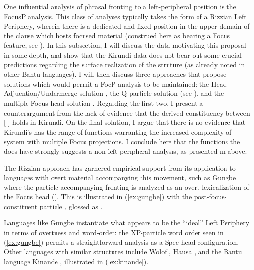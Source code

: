 \documentclass[12pt]{article}
\begin{document}
One influential analysis of phrasal fronting to a left-peripheral position is the FocusP analysis. This class of analyses typically takes the form of a Rizzian Left Periphery, wherein there is a dedicated and fixed position in the upper domain of the clause which hosts focused material (construed here as bearing a Focus feature, see \citealt{rizzi-1997}). In this subsection, I will discuss the data motivating this proposal in some depth, and show that the Kirundi data does not bear out some crucial predictions regarding the surface realization of the struture (as already noted in other Bantu languages). I will then discuss three approaches that propose solutions which would permit a FocP-analysis to be maintained: the Head Adjucntion/Undermerge solution \citep{fschwarz-2003,yuan-2017,yuan-2017gen}, the Q-particle solution (see \citealt{cable-2007,branan-erlewine-2022}), and the multiple-Focus-head solution \citep{abels-muriungi-2008}. Regarding the first two, I present a counterargument from the lack of evidence that the derived constituency between [ ] holds in Kirundi. On the final solution, I argue that there is no evidence that Kirundi's  has the range of functions warranting the increased complexity of system with multiple Focus projections. I conclude here that the functions the  does have strongly suggests a non-left-peripheral analysis, as presented in above.

The Rizzian  approach has garnered empirical support from its application to languages with overt material accompanying this movement, such as Gungbe where the particle accompanying fronting is analyzed as an overt lexicalization of the Focus head (\citealt{aboh-2016}). This is illustrated in (\ref{ex:gungbe}) with the post-focus-constituent particle , glossed as .

\bex
\ex {} \label{ex:gungbe}
\bxl
{}
\fxl
\fex

Languages like Gungbe instantiate what appears to be the ``ideal'' Left Periphery in terms of overtness and word-order: the XP-particle word order seen in (\ref{ex:gungbe}) permits a straightforward analysis as a Spec-head configuration. Other languages with similar structures include Wolof \citep{klecha-martinovic-2015,martinovic-2021move}, Hausa \citep{green-2007}, and the Bantu language Kinande \citep{schneider-zioga-2007}, illustrated in (\ref{ex:kinande}).
\end{document}
